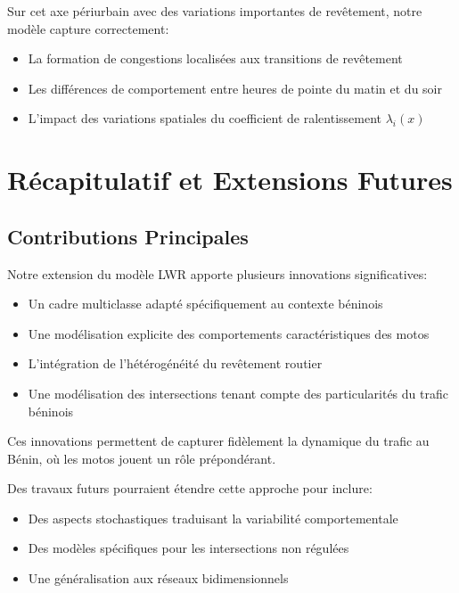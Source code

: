 Sur cet axe périurbain avec des variations importantes de revêtement, notre modèle capture correctement:
\begin{itemize}
\item La formation de congestions localisées aux transitions de revêtement
\item Les différences de comportement entre heures de pointe du matin et du soir
\item L'impact des variations spatiales du coefficient de ralentissement $\lambda_i(x)$
\end{itemize}

\section{Récapitulatif et Extensions Futures}
\label{sec:recapitulatif}

\subsection{Contributions Principales}
\label{subsec:contributions}

Notre extension du modèle LWR apporte plusieurs innovations significatives:
\begin{itemize}
\item Un cadre multiclasse adapté spécifiquement au contexte béninois
\item Une modélisation explicite des comportements caractéristiques des motos
\item L'intégration de l'hétérogénéité du revêtement routier
\item Une modélisation des intersections tenant compte des particularités du trafic béninois
\end{itemize}

Ces innovations permettent de capturer fidèlement la dynamique du trafic au Bénin, où les motos jouent un rôle prépondérant.

Des travaux futurs pourraient étendre cette approche pour inclure:
\begin{itemize}
\item Des aspects stochastiques traduisant la variabilité comportementale \cite{marbach2009stochastic}
\item Des modèles spécifiques pour les intersections non régulées \cite{ceylan2014traffic}
\item Une généralisation aux réseaux bidimensionnels \cite{zhang2003non}
\end{itemize}


